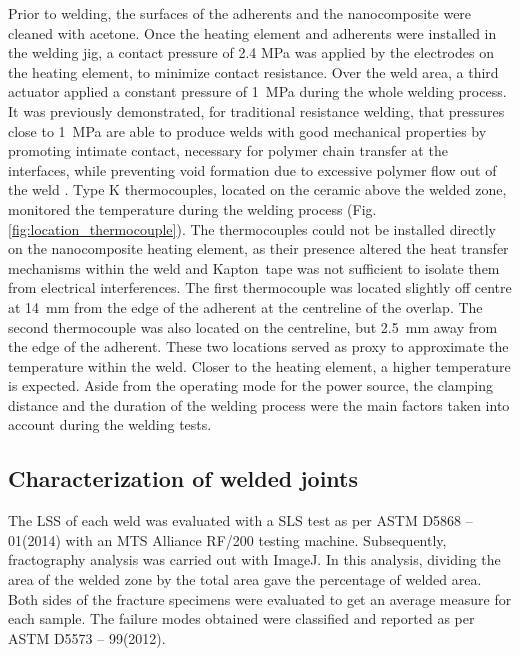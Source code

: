 \documentclass[11pt,review,times]{elsarticle}
\begin{document}
Prior to welding, the surfaces of the adherents and the nanocomposite were cleaned with acetone. 
Once the heating element and adherents were installed in the welding jig, a contact pressure of 2.4 MPa was applied by the electrodes on the heating element, to minimize contact resistance. 
Over the weld area, a third actuator applied a constant pressure of \SI{1}{\MPa} during the whole welding process. 
It was previously demonstrated, for traditional resistance welding, that pressures close to \SI{1}{\MPa} are able to produce welds with good mechanical properties by promoting intimate contact, necessary for polymer chain transfer at the interfaces, while preventing void formation due to excessive polymer flow out of the weld \cite{Ageorges2000a, Dube2007, Shi2014}. 
Type K thermocouples, located on the ceramic above the welded zone, monitored the temperature during the welding process (Fig. \ref{fig:location_thermocouple}). 
The thermocouples could not be installed directly on the nanocomposite heating element, as their presence altered the heat transfer mechanisms within the weld and Kapton\textregistered \ tape was not sufficient to isolate them from electrical interferences. 
The first thermocouple was located slightly off centre at \SI{14}{\milli\metre} from the edge of the adherent at the centreline of the overlap. 
The second thermocouple was also located on the centreline, but \SI{2.5}{\milli\metre} away from the edge of the adherent. 
These two locations served as proxy to approximate the temperature within the weld. 
Closer to the heating element, a higher temperature is expected. 
Aside from the operating mode for the power source, the clamping distance and the duration of the welding process were the main factors taken into account during the welding tests. 

\subsection{Characterization of welded joints}

The LSS of each weld was evaluated with a SLS test as per ASTM D5868 – 01(2014) with an MTS Alliance RF/200 testing machine. 
Subsequently, fractography analysis was carried out with ImageJ. 
In this analysis, dividing the area of the welded zone by the total area gave the percentage of welded area. 
Both sides of the fracture specimens were evaluated to get an average measure for each sample. 
The failure modes obtained were classified and reported as per ASTM D5573 – 99(2012). 
\end{document}
